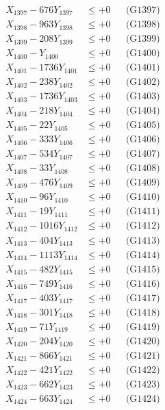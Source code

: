 \documentclass[a4paper,10pt]{article}
\begin{document}
{\begin{align}
X_{1397} - 676Y_{1397} &\leq +0 && \text{(G1397)} \\
X_{1398} - 963Y_{1398} &\leq +0 && \text{(G1398)} \\
X_{1399} - 208Y_{1399} &\leq +0 && \text{(G1399)} \\
X_{1400} - Y_{1400} &\leq +0 && \text{(G1400)} \\
\allowbreak
X_{1401} - 1736Y_{1401} &\leq +0 && \text{(G1401)} \\
X_{1402} - 238Y_{1402} &\leq +0 && \text{(G1402)} \\
X_{1403} - 1736Y_{1403} &\leq +0 && \text{(G1403)} \\
X_{1404} - 218Y_{1404} &\leq +0 && \text{(G1404)} \\
X_{1405} - 22Y_{1405} &\leq +0 && \text{(G1405)} \\
X_{1406} - 333Y_{1406} &\leq +0 && \text{(G1406)} \\
X_{1407} - 534Y_{1407} &\leq +0 && \text{(G1407)} \\
X_{1408} - 33Y_{1408} &\leq +0 && \text{(G1408)} \\
X_{1409} - 476Y_{1409} &\leq +0 && \text{(G1409)} \\
X_{1410} - 96Y_{1410} &\leq +0 && \text{(G1410)} \\
\allowbreak
X_{1411} - 19Y_{1411} &\leq +0 && \text{(G1411)} \\
X_{1412} - 1016Y_{1412} &\leq +0 && \text{(G1412)} \\
X_{1413} - 404Y_{1413} &\leq +0 && \text{(G1413)} \\
X_{1414} - 1113Y_{1414} &\leq +0 && \text{(G1414)} \\
X_{1415} - 482Y_{1415} &\leq +0 && \text{(G1415)} \\
X_{1416} - 749Y_{1416} &\leq +0 && \text{(G1416)} \\
X_{1417} - 403Y_{1417} &\leq +0 && \text{(G1417)} \\
X_{1418} - 301Y_{1418} &\leq +0 && \text{(G1418)} \\
X_{1419} - 71Y_{1419} &\leq +0 && \text{(G1419)} \\
X_{1420} - 204Y_{1420} &\leq +0 && \text{(G1420)} \\
\allowbreak
X_{1421} - 866Y_{1421} &\leq +0 && \text{(G1421)} \\
X_{1422} - 421Y_{1422} &\leq +0 && \text{(G1422)} \\
X_{1423} - 662Y_{1423} &\leq +0 && \text{(G1423)} \\
X_{1424} - 663Y_{1424} &\leq +0 && \text{(G1424)} \\

\end{align}}
\end{document}
